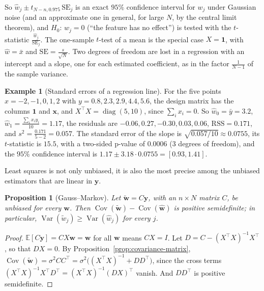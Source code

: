 \documentclass[11pt]{article}
\newcommand{\E}{\mathbb{E}}
\DeclareMathOperator{\Var}{Var}
\DeclareMathOperator{\Cov}{Cov}
\theoremstyle{definition}
\newtheorem{example}[definition]{Example}
\theoremstyle{plain}
\newtheorem{proposition}[definition]{Proposition}
\theoremstyle{remark}
\DeclareMathOperator{\diag}{diag}
\begin{document}
So $\hat w_j \pm t_{N-n, 0.975}\,\mathrm{SE}_j$ is an exact $95\%$ confidence interval for $w_j$ under Gaussian noise (and an approximate one in general, for large $N$, by the central limit theorem), and $H_0$: $w_j = 0$ (``the feature has no effect'') is tested with the $t$-statistic $\frac{\hat w_j}{\mathrm{SE}_j}$. The one-sample $t$-test of a mean is the special case $X = \mathbf{1}$, with $\hat w = \bar x$ and $\mathrm{SE} = \frac{s}{\sqrt{N}}$. Two degrees of freedom are lost in a regression with an intercept and a slope, one for each estimated coefficient, as in the factor $\frac{1}{N - 1}$ of the sample variance.

\begin{example}[Standard errors of a regression line]\label{ex:regression-t}
    For the five points $x = -2, -1, 0, 1, 2$ with $y = 0.8, 2.3, 2.9, 4.4, 5.6$, the design matrix has the columns $\mathbf{1}$ and $\mathbf{x}$, and $X^\top X = \diag(5, 10)$, since $\sum_i x_i = 0$. So $\hat w_0 = \bar y = 3.2$, $\hat w_1 = \frac{\sum_i x_iy_i}{10} = 1.17$, the residuals are $-0.06, 0.27, -0.30, 0.03, 0.06$, $\mathrm{RSS} = 0.171$, and $s^2 = \frac{0.171}{5 - 2} = 0.057$. The standard error of the slope is $\sqrt{0.057/10} \approx 0.0755$, its $t$-statistic is $15.5$, with a two-sided p-value of $0.0006$ ($3$ degrees of freedom), and the $95\%$ confidence interval is $1.17 \pm 3.18 \cdot 0.0755 = [0.93, 1.41]$.
\end{example}

Least squares is not only unbiased, it is also the most precise among the unbiased estimators that are linear in $\mathbf{y}$.

\begin{proposition}[Gauss--Markov]\label{prop:gauss-markov}
    Let $\tilde{\mathbf{w}} = C\mathbf{y}$, with an $n \times N$ matrix $C$, be unbiased for every $\mathbf{w}$. Then $\Cov(\tilde{\mathbf{w}}) - \Cov(\hat{\mathbf{w}})$ is positive semidefinite; in particular, $\Var(\tilde w_j) \geq \Var(\hat w_j)$ for every $j$.
\end{proposition}

\begin{proof}
    $\E[C\mathbf{y}] = CX\mathbf{w} = \mathbf{w}$ for all $\mathbf{w}$ means $CX = I$. Let $D = C - (X^\top X)^{-1}X^\top$, so that $DX = 0$. By Proposition~\ref{prop:covariance-matrix}, $\Cov(\tilde{\mathbf{w}}) = \sigma^2CC^\top = \sigma^2\big((X^\top X)^{-1} + DD^\top\big)$, since the cross terms $(X^\top X)^{-1}X^\top D^\top = (X^\top X)^{-1}(DX)^\top$ vanish. And $DD^\top$ is positive semidefinite.
\end{proof}
\end{document}
